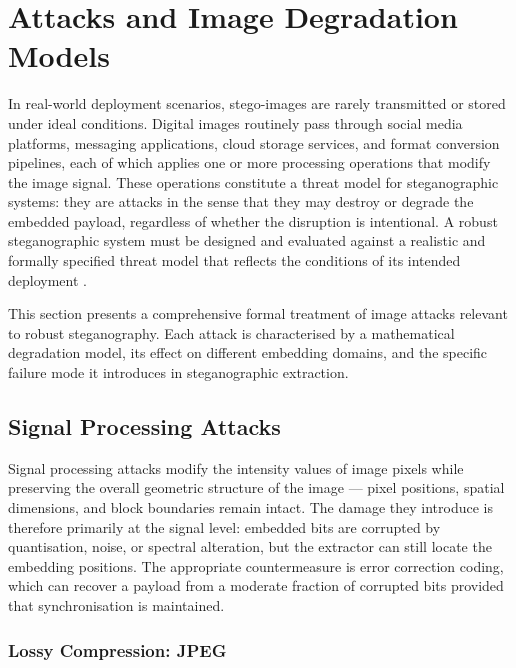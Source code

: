\documentclass[12pt,a4paper,oneside]{report}
\begin{document}
	\section{Attacks and Image Degradation Models}
	\label{sec:attacks}
	
	In real-world deployment scenarios, stego-images are rarely transmitted or stored under ideal
	conditions. Digital images routinely pass through social media platforms, messaging applications,
	cloud storage services, and format conversion pipelines, each of which applies one or more
	processing operations that modify the image signal. These operations constitute a threat model for
	steganographic systems: they are attacks in the sense that they may destroy or degrade the
	embedded payload, regardless of whether the disruption is intentional. A robust steganographic
	system must be designed and evaluated against a realistic and formally specified threat model that
	reflects the conditions of its intended deployment \cite{petitcolas1999information,
		cox2007digital}.
	
	This section presents a comprehensive formal treatment of image attacks relevant to robust
	steganography. Each attack is characterised by a mathematical degradation model, its effect on
	different embedding domains, and the specific failure mode it introduces in steganographic
	extraction. 
	
	\subsection{Signal Processing Attacks}
	\label{subsec:signal_attacks}
	
	Signal processing attacks modify the intensity values of image pixels while preserving the overall
	geometric structure of the image — pixel positions, spatial dimensions, and block boundaries remain
	intact. The damage they introduce is therefore primarily at the signal level: embedded bits are
	corrupted by quantisation, noise, or spectral alteration, but the extractor can still locate the
	embedding positions. The appropriate countermeasure is error correction coding, which can recover
	a payload from a moderate fraction of corrupted bits provided that synchronisation is maintained.
	
	\subsubsection{Lossy Compression: JPEG}
	
\end{document}
